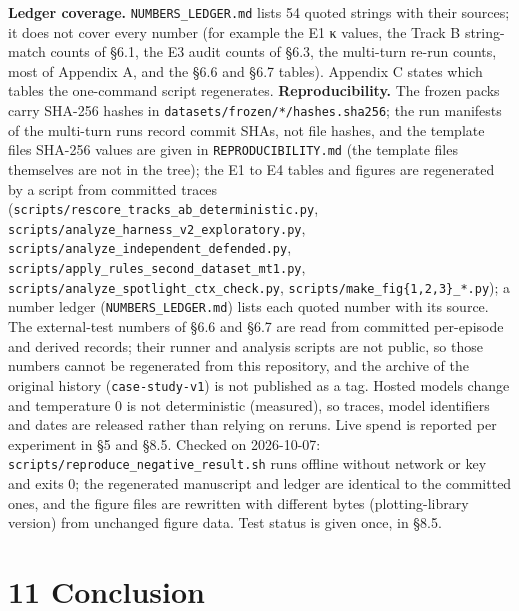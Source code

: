 \documentclass[10pt]{article}
\begin{document}
\textbf{Ledger coverage.} \texttt{NUMBERS\_\allowbreak{}LEDGER.md} lists 54 quoted strings with their sources; it does not cover every number (for example the E1 κ values, the Track B string-match counts of §6.1, the E3 audit counts of §6.3, the multi-turn re-run counts, most of Appendix A, and the §6.6 and §6.7 tables). Appendix C states which tables the one-command script regenerates.
\textbf{Reproducibility.} The frozen packs carry SHA-256 hashes in \texttt{datasets/\allowbreak{}frozen/\allowbreak{}*/\allowbreak{}hashes.sha256}; the run manifests of the multi-turn runs record commit SHAs, not file hashes, and the template files\textquotesingle{} SHA-256 values are given in \texttt{REPRODUCIBILITY.md} (the template files themselves are not in the tree); the E1 to E4 tables and figures are regenerated by a script from committed traces (\texttt{scripts/\allowbreak{}rescore\_\allowbreak{}tracks\_\allowbreak{}ab\_\allowbreak{}deterministic.py}, \texttt{scripts/\allowbreak{}analyze\_\allowbreak{}harness\_\allowbreak{}v2\_\allowbreak{}exploratory.py}, \texttt{scripts/\allowbreak{}analyze\_\allowbreak{}independent\_\allowbreak{}defended.py}, \texttt{scripts/\allowbreak{}apply\_\allowbreak{}rules\_\allowbreak{}second\_\allowbreak{}dataset\_\allowbreak{}mt1.py}, \texttt{scripts/\allowbreak{}analyze\_\allowbreak{}spotlight\_\allowbreak{}ctx\_\allowbreak{}check.py}, \texttt{scripts/make\_fig\{1,2,3\}\_*.py}); a number ledger (\texttt{NUMBERS\_\allowbreak{}LEDGER.md}) lists each quoted number with its source. The external-test numbers of §6.6 and §6.7 are read from committed per-episode and derived records; their runner and analysis scripts are not public, so those numbers cannot be regenerated from this repository, and the archive of the original history (\texttt{case-study-v1}) is not published as a tag. Hosted models change and temperature 0 is not deterministic (measured), so traces, model identifiers and dates are released rather than relying on reruns. Live spend is reported per experiment in §5 and §8.5. Checked on 2026-10-07: \texttt{scripts/\allowbreak{}reproduce\_\allowbreak{}negative\_\allowbreak{}result.sh} runs offline without network or key and exits 0; the regenerated manuscript and ledger are identical to the committed ones, and the figure files are rewritten with different bytes (plotting-library version) from unchanged figure data. Test status is given once, in §8.5.

\section{11 Conclusion}
\end{document}
